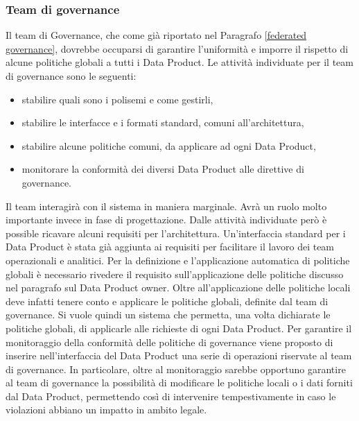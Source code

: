 \documentclass[12pt]{report}
\begin{document}
\subsubsection{Team di governance}
Il team di Governance, che come già riportato nel Paragrafo \ref{federated governance}, dovrebbe occuparsi di garantire l'uniformità e imporre il rispetto di alcune politiche globali a tutti i Data Product. 
Le attività individuate per il team di governance sono le seguenti:
\begin{itemize}
    \item stabilire quali sono i polisemi e come gestirli,
    \item stabilire le interfacce e i formati standard, comuni all'architettura,
    \item stabilire alcune politiche comuni, da applicare ad ogni Data Product,
    \item monitorare la conformità dei diversi Data Product alle direttive di governance.
\end{itemize}
Il team interagirà con il sistema in maniera marginale. 
Avrà un ruolo molto importante invece in fase di progettazione.
Dalle attività individuate però è possible ricavare alcuni requisiti per l'architettura.
Un'interfaccia standard per i Data Product è stata già aggiunta ai requisiti per facilitare il lavoro dei team operazionali e analitici.
Per la definizione e l'applicazione automatica di politiche globali è necessario rivedere il requisito sull'applicazione delle politiche discusso nel paragrafo sul Data Product owner.
Oltre all'applicazione delle politiche locali deve infatti tenere conto e applicare le politiche globali, definite dal team di governance. 
Si vuole quindi un sistema che permetta, una volta dichiarate le politiche globali, di applicarle alle richieste di ogni Data Product.
Per garantire il monitoraggio della conformità delle politiche di governance viene proposto di inserire nell'interfaccia del Data Product una serie di operazioni riservate al team di governance.
In particolare, oltre al monitoraggio sarebbe opportuno garantire al team di governance la possibilità di modificare le politiche locali o i dati forniti dal Data Product, permettendo così di intervenire tempestivamente in caso le violazioni abbiano un impatto in ambito legale.
\end{document}
